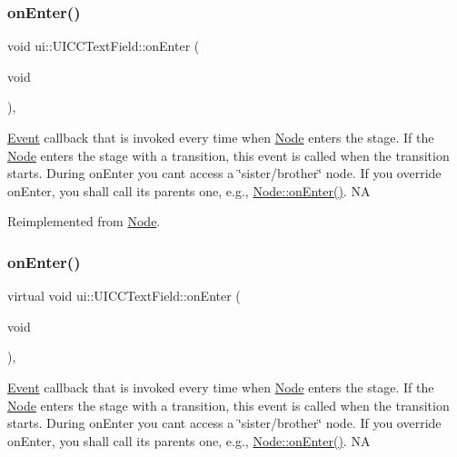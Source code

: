 \subsubsection{\texorpdfstring{on\+Enter()}{onEnter()}\hspace{0.1cm}{\footnotesize\ttfamily [1/2]}}
{\footnotesize\ttfamily void ui\+::\+U\+I\+C\+C\+Text\+Field\+::on\+Enter (\begin{DoxyParamCaption}\item[{void}]{ }\end{DoxyParamCaption})\hspace{0.3cm}{\ttfamily [override]}, {\ttfamily [virtual]}}

\hyperlink{classEvent}{Event} callback that is invoked every time when \hyperlink{classNode}{Node} enters the \textquotesingle{}stage\textquotesingle{}. If the \hyperlink{classNode}{Node} enters the \textquotesingle{}stage\textquotesingle{} with a transition, this event is called when the transition starts. During on\+Enter you can\textquotesingle{}t access a \char`\"{}sister/brother\char`\"{} node. If you override on\+Enter, you shall call its parent\textquotesingle{}s one, e.\+g., \hyperlink{classNode_a7f51764c4afd5018a052b9ef71c03374}{Node\+::on\+Enter()}.  NA 

Reimplemented from \hyperlink{classNode_a7f51764c4afd5018a052b9ef71c03374}{Node}.

\mbox{\label{classui_1_1UICCTextField_ab4689762548b34a3309d8679b3add550}} 
\subsubsection{\texorpdfstring{on\+Enter()}{onEnter()}\hspace{0.1cm}{\footnotesize\ttfamily [2/2]}}
{\footnotesize\ttfamily virtual void ui\+::\+U\+I\+C\+C\+Text\+Field\+::on\+Enter (\begin{DoxyParamCaption}\item[{void}]{ }\end{DoxyParamCaption})\hspace{0.3cm}{\ttfamily [override]}, {\ttfamily [virtual]}}

\hyperlink{classEvent}{Event} callback that is invoked every time when \hyperlink{classNode}{Node} enters the \textquotesingle{}stage\textquotesingle{}. If the \hyperlink{classNode}{Node} enters the \textquotesingle{}stage\textquotesingle{} with a transition, this event is called when the transition starts. During on\+Enter you can\textquotesingle{}t access a \char`\"{}sister/brother\char`\"{} node. If you override on\+Enter, you shall call its parent\textquotesingle{}s one, e.\+g., \hyperlink{classNode_a7f51764c4afd5018a052b9ef71c03374}{Node\+::on\+Enter()}.  NA 

